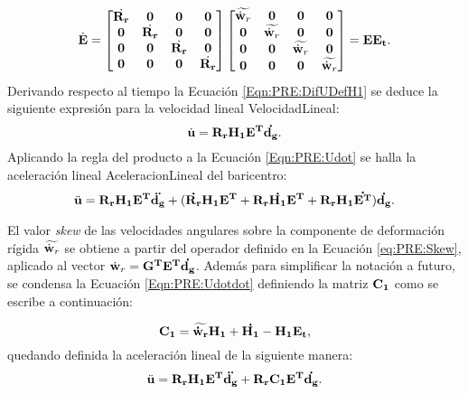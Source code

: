 \begin{equation}
	\dot{\bf{E}}=\begin{bmatrix}
		\dot{\bf{R}_r} & \bf{0} & \bf{0} & \bf{0} \\
		\bf{0}&\dot{\bf{R}_r}  & \bf{0} & \bf{0}\\
		\bf{0}& \bf{0} & \dot{\bf{R}_r} & \bf{0}\\
		\bf{0}& \bf{0} & \bf{0} & \dot{\bf{R}_r}
	\end{bmatrix}\begin{bmatrix}
		\widetilde{\dot{\bf{w}}_r} & \bf{0} & \bf{0} & \bf{0} \\
		\bf{0}& \widetilde{\dot{\bf{w}}_r}  & \bf{0} & \bf{0}\\
		\bf{0}& \bf{0} & \widetilde{\dot{\bf{w}}_r} & \bf{0}\\
		\bf{0}& \bf{0} & \bf{0} & \widetilde{\dot{\bf{w}}_r}
	\end{bmatrix}=\bf{E}\bf{E}_t.
\end{equation}
 Derivando respecto al tiempo la Ecuación \eqref{Eqn:PRE:DifUDefH1} se deduce la siguiente expresión para la velocidad lineal \gls{VelocidadLineal}:
\begin{equation}
	\label{Eqn:PRE:Udot}
	\dot{\bf{u}} =\bf{R}_r \bf{H}_1 \bf{E}^T \dot{\bf{d}_g}.
\end{equation}
Aplicando la regla del producto a la Ecuación \eqref{Eqn:PRE:Udot} se halla la aceleración lineal \gls{AceleracionLineal} del baricentro:
\begin{equation}
	\label{Eqn:PRE:Udotdot}
	\ddot{\bf{u}} = \bf{R}_r \bf{H}_1 \bf{E}^T \ddot{\bf{d}_g} + (\dot{\bf{R}_r} \bf{H}_1 \bf{E}^T+\bf{R}_r \dot{\bf{H}_1} \bf{E}^T+\bf{R}_r \bf{H}_1 \dot{\bf{E}^T})\dot{\bf{d}_g}.
\end{equation}

El valor \textit{skew} de las velocidades angulares sobre la componente de deformación rígida $\widetilde{\dot{\bf{w}}_r}$ se obtiene a partir del operador definido en la Ecuación \eqref{eq:PRE:Skew}, aplicado al vector $\dot{\bf{w}}_r=\bf{G}^T\bf{E}^T\dot{\bf{d}_g}$. Además para simplificar la notación a futuro, se condensa la Ecuación \eqref{Eqn:PRE:Udotdot} definiendo la matriz $\bf{C}_1$ como se escribe a continuación:

\begin{equation}
	\label{Eqn:PRE:DefC1}
	\bf{C}_1 = \widetilde{\dot{\bf{w}}_r}\bf{H_1}+\dot{\bf{H}_1}-\bf{H}_1\bf{E}_t,
\end{equation}
quedando definida la aceleración lineal de la siguiente manera:
\begin{equation}
	\label{Eqn:PRE:UdotdotC1}
	\ddot{\bf{u}} = \bf{R}_r\bf{H}_1\bf{E}^T\ddot{{d}_g}+\bf{R}_r\bf{C}_1\bf{E}^T\dot{{d}_g}.
\end{equation}

